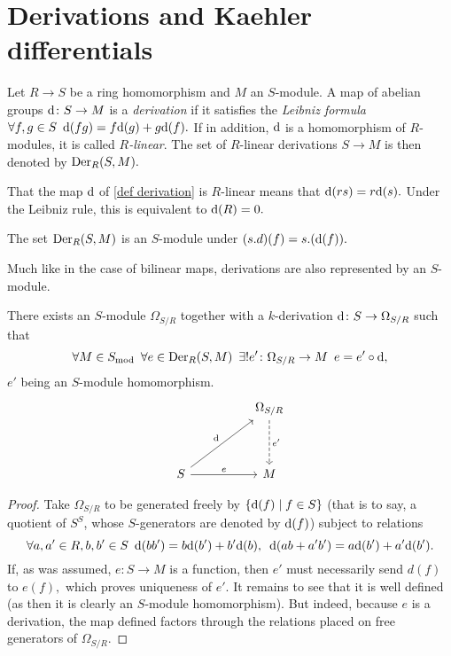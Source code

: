 \section{Derivations and Kaehler differentials}

\begin{df}
  \label{def derivation}
  Let \(R \to S\) be a ring homomorphism and \(M\) an \(S\)-module. A map of abelian groups \(\text{d} \colon S \to M\) is a \emph{derivation} if it satisfies the \emph{Leibniz formula}
  \(\forall f, g \in S \enspace \text{d}(fg) = f \text{d}(g) + g \text{d}(f).\)
  If in addition, \(\text{d}\) is a homomorphism of \(R\)-modules, it is called \emph{\(R\)-linear}.
  The set of \(R\)-linear derivations \(S \to M\) is then denoted by \(\operatorname{Der}_R(S, M).\)
\end{df}

\begin{note}
  That the map \(\text{d}\) of \cref{def derivation} is \(R\)-linear means that \(\text{d}(rs) = r \text{d}(s).\) Under the Leibniz rule, this is equivalent to \(\text{d}(R) = 0.\)
\end{note}

\begin{prop}
  The set \(\operatorname{Der}_R(S, M)\) is an \(S\)-module under
  \((s . d)(f) = s .(\text{d}(f)).\)
\end{prop}

Much like in the case of bilinear maps, derivations are also represented by an \(S\)-module.

\begin{theorem}
  \label{kaehler exists}
  There exists an $S$-module
  \( \Omega_{S / {R}}\)
  together with a \(k\)-derivation
  \(\text{d} \colon S \to \Omega_{S /{R}}\)
  such that
  \[ \forall M \in {S}_\mathrm{mod} \enspace \forall e \in \operatorname{Der}_R(S, M) \enspace \exists \text{!} e' \colon \Omega_{S /{R}} \to M \enspace e = e' \circ \text{d},\]
  \(e'\) being an \(S\)-module homomorphism.
  \begin{equation*}
    \begin{tikzcd}[column sep = huge, row sep = huge]
      & \Omega_{S/{R}} \arrow[dashed]{d}{e'} \\
      S \arrow{ru}{\dif} \arrow{r}{e} & M
    \end{tikzcd}
  \end{equation*}
\end{theorem}
\begin{proof}
  Take \(\Omega_{S/{R}}\) to be generated freely by \(\{\text{d}(f) \mathrel{|} f \in S\}\) (that is to say, a quotient of \(S^S\), whose \(S\)-generators are denoted by \(\text{d}(f)\)) subject to relations
  \[\forall a, a' \in R, b, b' \in S \enspace \text{d}(b b') = b \text{d}(b') + b' \text{d} (b), \enspace \text{d}(ab + a'b') = a \text{d}(b') + a' \text{d}(b').\]
  If, as was assumed, \(e \colon S \to M\) is a function, then \(e'\) must necessarily send \(d(f)\) to \(e(f),\) which proves uniqueness of \(e'.\) It remains to see that it is well defined (as then it is clearly an \(S\)-module homomorphism). But indeed, because \(e\) is a derivation, the map defined factors through the relations placed on free generators of \(\Omega_{S/{R}}.\)
\end{proof}

